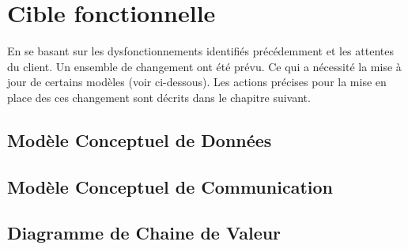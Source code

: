 \section{Cible fonctionnelle}

    En se basant sur les dysfonctionnements identifiés précédemment et les attentes du client. Un ensemble de changement ont été prévu. Ce qui a nécessité la mise à jour de certains modèles (voir ci-dessous). Les actions précises pour la mise en place des ces changement sont décrits dans le chapitre suivant.

    \subsection{Modèle Conceptuel de Données}


    \subsection{Modèle Conceptuel de Communication}


    \subsection{Diagramme de Chaine de Valeur}


